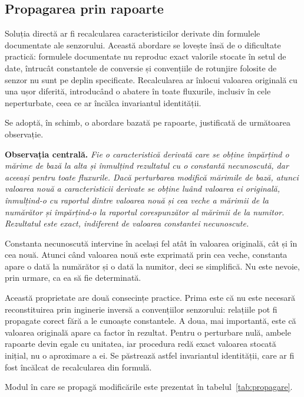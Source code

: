 \subsection{Propagarea prin rapoarte}\label{subsec:propagare}

Soluția directă ar fi recalcularea caracteristicilor derivate din formulele documentate ale senzorului. Această abordare se lovește însă de o dificultate practică: formulele documentate nu reproduc exact valorile stocate în setul de date, întrucât constantele de conversie și convențiile de rotunjire folosite de senzor nu sunt pe deplin specificate. Recalcularea ar înlocui valoarea originală cu una ușor diferită, introducând o abatere în toate fluxurile, inclusiv în cele neperturbate, ceea ce ar încălca invariantul identității.

Se adoptă, în schimb, o abordare bazată pe rapoarte, justificată de următoarea observație.

\medskip
\noindent\textbf{Observația centrală.} \textit{Fie o caracteristică derivată care se obține împărțind o mărime de bază la alta și înmulțind rezultatul cu o constantă necunoscută, dar aceeași pentru toate fluxurile. Dacă perturbarea modifică mărimile de bază, atunci valoarea nouă a caracteristicii derivate se obține luând valoarea ei originală, înmulțind-o cu raportul dintre valoarea nouă și cea veche a mărimii de la numărător și împărțind-o la raportul corespunzător al mărimii de la numitor. Rezultatul este exact, indiferent de valoarea constantei necunoscute.}

\medskip

Constanta necunoscută intervine în același fel atât în valoarea originală, cât și în cea nouă. Atunci când valoarea nouă este exprimată prin cea veche, constanta apare o dată la numărător și o dată la numitor, deci se simplifică. Nu este nevoie, prin urmare, ca ea să fie determinată.

Această proprietate are două consecințe practice. Prima este că nu este necesară reconstituirea prin inginerie inversă a convențiilor senzorului: relațiile pot fi propagate corect fără a le cunoaște constantele. A doua, mai importantă, este că valoarea originală apare ca factor în rezultat. Pentru o perturbare nulă, ambele rapoarte devin egale cu unitatea, iar procedura redă exact valoarea stocată inițial, nu o aproximare a ei. Se păstrează astfel invariantul identității, care ar fi fost încălcat de recalcularea din formulă.

Modul în care se propagă modificările este prezentat în tabelul~\ref{tab:propagare}.

